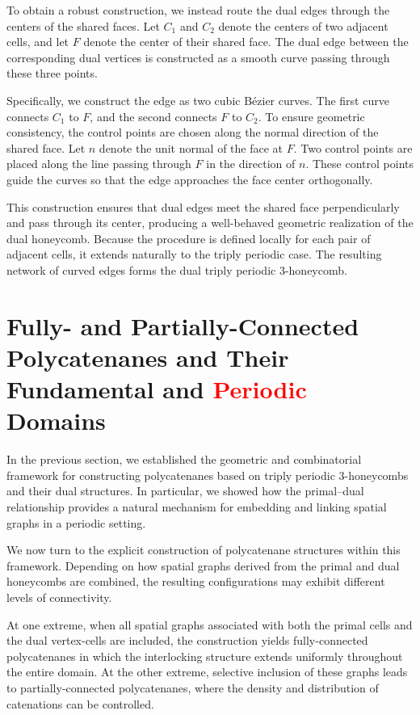 \documentclass[times,twocolumn,final]{elsarticle}
\begin{document}
To obtain a robust construction, we instead route the dual edges through the centers of the shared faces. Let $C_1$ and $C_2$ denote the centers of two adjacent cells, and let $F$ denote the center of their shared face. The dual edge between the corresponding dual vertices is constructed as a smooth curve passing through these three points.

Specifically, we construct the edge as two cubic Bézier curves. The first curve connects $C_1$ to $F$, and the second connects $F$ to $C_2$. To ensure geometric consistency, the control points are chosen along the normal direction of the shared face. Let $n$ denote the unit normal of the face at $F$. Two control points are placed along the line passing through $F$ in the direction of $n$. These control points guide the curves so that the edge approaches the face center orthogonally.


This construction ensures that dual edges meet the shared face perpendicularly and pass through its center, producing a well-behaved geometric realization of the dual honeycomb. Because the procedure is defined locally for each pair of adjacent cells, it extends naturally to the triply periodic case. The resulting network of curved edges forms the dual triply periodic $3$-honeycomb.


\section{Fully- and Partially-Connected Polycatenanes and Their Fundamental and \textcolor{red}{Periodic} Domains}

In the previous section, we established the geometric and combinatorial framework for constructing polycatenanes based on triply periodic 3-honeycombs and their dual structures. In particular, we showed how the primal–dual relationship provides a natural mechanism for embedding and linking spatial graphs in a periodic setting.

We now turn to the explicit construction of polycatenane structures within this framework. Depending on how spatial graphs derived from the primal and dual honeycombs are combined, the resulting configurations may exhibit different levels of connectivity.


At one extreme, when all spatial graphs associated with both the primal cells and the dual vertex-cells are included, the construction yields fully-connected polycatenanes in which the interlocking structure extends uniformly throughout the entire domain. At the other extreme, selective inclusion of these graphs leads to partially-connected polycatenanes, where the density and distribution of catenations can be controlled.
\end{document}
